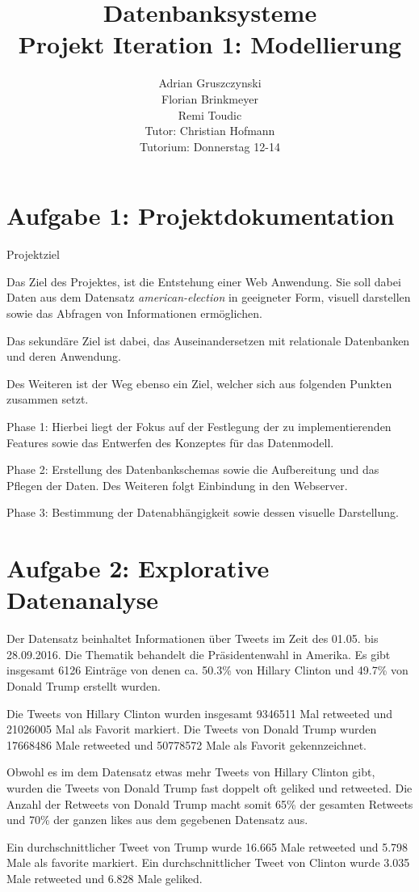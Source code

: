 \documentclass[12pt]{article}
\title{Datenbanksysteme\\
			 Projekt Iteration 1: Modellierung}
\author{Adrian Gruszczynski\\
			Florian Brinkmeyer \\
			Remi Toudic\\
		Tutor: Christian Hofmann\\
		Tutorium: Donnerstag 12-14}
\begin{document}
\maketitle
\section*{Aufgabe 1: Projektdokumentation}
Projektziel 

Das Ziel des Projektes, ist die Entstehung einer Web Anwendung. Sie soll dabei Daten aus dem Datensatz \textit{american-election} in geeigneter Form, visuell darstellen sowie das Abfragen von Informationen ermöglichen. 

Das sekundäre Ziel ist dabei, das Auseinandersetzen mit relationale Datenbanken und deren Anwendung. 


Des Weiteren ist der Weg ebenso ein Ziel, welcher sich aus folgenden Punkten zusammen setzt. 

Phase 1: 
Hierbei liegt der Fokus auf der Festlegung der zu implementierenden Features sowie das Entwerfen des Konzeptes für das Datenmodell. 

Phase 2: 
Erstellung des Datenbankschemas sowie die Aufbereitung und das Pflegen der Daten. Des Weiteren folgt Einbindung in den Webserver.

Phase 3:
Bestimmung der Datenabhängigkeit sowie dessen visuelle Darstellung. 


\section*{Aufgabe 2: Explorative Datenanalyse}
Der Datensatz beinhaltet Informationen über Tweets im Zeit des 01.05. bis 28.09.2016. Die Thematik behandelt die Präsidentenwahl in Amerika. Es gibt insgesamt 6126 Einträge von denen ca. 50.3\% von Hillary Clinton und 49.7\% von Donald Trump erstellt wurden.

 Die Tweets von Hillary Clinton wurden insgesamt 9346511 Mal retweeted und 21026005 Mal als Favorit markiert. Die Tweets von Donald Trump wurden 17668486 Male retweeted und 50778572 Male als Favorit gekennzeichnet. 
 
Obwohl es im dem Datensatz etwas mehr Tweets von Hillary Clinton gibt, wurden die Tweets von Donald Trump fast doppelt oft geliked und retweeted.  
Die Anzahl der Retweets von Donald Trump macht somit 65\% der gesamten Retweets und 70\% der ganzen likes aus dem gegebenen Datensatz aus.

 Ein durchschnittlicher Tweet von Trump wurde 16.665 Male retweeted und 5.798 Male als favorite markiert. 
Ein durchschnittlicher Tweet von Clinton wurde 3.035 Male retweeted und 6.828 Male geliked.
\end{document}
